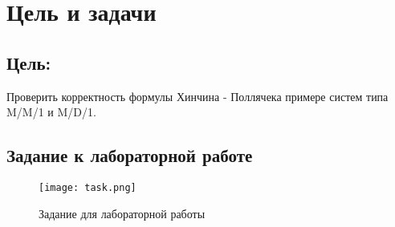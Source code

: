 \chapter{Цель и задачи}
\label{ch:intro}

\section*{\textbf{Цель:}} 

Проверить корректность формулы Хинчина - Поллячека примере систем типа M/M/1 и M/D/1.
\section*{Задание к лабораторной работе}

\begin{figure}[H]
    \centering
    \texttt{[image: task.png]}
    \caption{Задание для лабораторной работы}
\end{figure}


\endinput